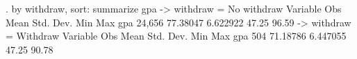 . by withdraw, sort: summarize gpa
{\smallskip}
-> withdraw = No withdraw
{\smallskip}
    Variable {\VBAR}        Obs        Mean    Std. Dev.       Min        Max
         gpa {\VBAR}     24,656    77.38047    6.622922      47.25      96.59
{\smallskip}
-> withdraw = Withdraw
{\smallskip}
    Variable {\VBAR}        Obs        Mean    Std. Dev.       Min        Max
         gpa {\VBAR}        504    71.18786    6.447055      47.25      90.78
{\smallskip}
{\smallskip}
